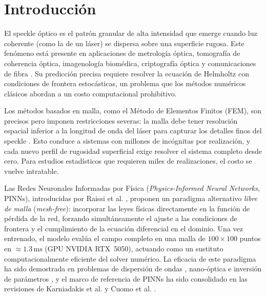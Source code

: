 
\section{Introducción}
\label{sec:intro}

El speckle óptico es el patrón granular de alta intensidad que emerge cuando luz coherente
(como la de un láser) se dispersa sobre una superficie rugosa.
Este fenómeno está presente en aplicaciones de metrología óptica, tomografía de coherencia
óptica, imagenología biomédica, criptografía óptica y comunicaciones de fibra
\cite{Goodman2007_Speckle}.
Su predicción precisa requiere resolver la ecuación de Helmholtz con condiciones de frontera
estocásticas, un problema que los métodos numéricos clásicos abordan a un costo computacional
prohibitivo.

Los métodos basados en malla, como el Método de Elementos Finitos (FEM), son precisos pero
imponen restricciones severas: la malla debe tener resolución espacial inferior a la longitud
de onda del láser para capturar los detalles finos del speckle \cite{Jin2014_FEM}.
Esto conduce a sistemas con millones de incógnitas por realización, y cada nuevo perfil de
rugosidad superficial exige resolver el sistema completo desde cero.
Para estudios estadísticos que requieren miles de realizaciones, el costo se vuelve intratable.

Las Redes Neuronales Informadas por Física (\textit{Physics-Informed Neural Networks},
PINNs), introducidas por Raissi et al. \cite{Raissi2019_PINNs}, proponen un paradigma
alternativo \textit{libre de malla} (\textit{mesh-free}): incorporar las leyes físicas
directamente en la función de pérdida de la red, forzando simultáneamente el ajuste a las
condiciones de frontera y el cumplimiento de la ecuación diferencial en el dominio.
Una vez entrenado, el modelo evalúa el campo completo en una malla de
$100 \times 100$ puntos en $\approx 1.3\,\mathrm{ms}$ (GPU NVIDIA RTX~5050),
actuando como un sustituto computacionalmente eficiente del solver numérico.
La eficacia de este paradigma ha sido demostrada en problemas de dispersión de ondas
\cite{Fang2020_scattering}, nano-óptica e inversión de parámetros
\cite{Chen2020_nanoptics}, y el marco de referencia de PINNs ha sido consolidado
en las revisiones de Karniadakis et al. \cite{Karniadakis2021_review} y
Cuomo et al. \cite{Cuomo2022_review}.

